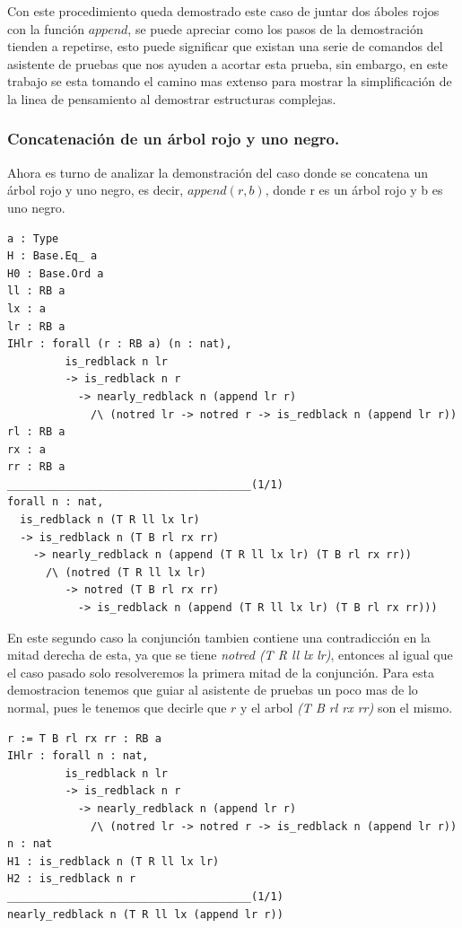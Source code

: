 \documentclass[8pt,leqno,pdflatex,spanish]{book}
\theoremstyle{plain}
\theoremstyle{definition}
\theoremstyle{remark}
\begin{document}
Con este procedimiento queda demostrado este caso de juntar dos \'aboles rojos con la funci\'on 
$append$, se puede apreciar como los pasos de la demostraci\'on tienden a repetirse, esto puede 
significar que existan una serie de comandos del asistente de pruebas que nos ayuden a acortar 
esta prueba, sin embargo, en este trabajo se esta tomando el camino mas extenso para mostrar la 
simplificaci\'on de la linea de pensamiento al demostrar estructuras complejas.

\subsubsection{Concatenaci\'on de un \'arbol rojo y uno negro.} 

Ahora es turno de analizar la demonstraci\'on del caso donde se concatena un \'arbol rojo y uno negro, es decir, $append(r,b)$, donde r es un \'arbol rojo y b es uno negro.

\begin{verbatim}
a : Type
H : Base.Eq_ a
H0 : Base.Ord a
ll : RB a
lx : a
lr : RB a
IHlr : forall (r : RB a) (n : nat),
         is_redblack n lr
         -> is_redblack n r
           -> nearly_redblack n (append lr r)
             /\ (notred lr -> notred r -> is_redblack n (append lr r))
rl : RB a
rx : a
rr : RB a
______________________________________(1/1)
forall n : nat,
  is_redblack n (T R ll lx lr)
  -> is_redblack n (T B rl rx rr)
    -> nearly_redblack n (append (T R ll lx lr) (T B rl rx rr))
      /\ (notred (T R ll lx lr)
         -> notred (T B rl rx rr)
           -> is_redblack n (append (T R ll lx lr) (T B rl rx rr)))
\end{verbatim}

En este segundo caso la conjunci\'on tambien contiene una contradicci\'on en la mitad derecha de 
esta, ya que se tiene \textit{notred (T R ll lx lr)}, entonces al igual que el caso pasado solo 
resolveremos la primera mitad de la conjunci\'on. Para esta demostracion tenemos que guiar al asistente de pruebas un poco mas de lo normal, pues le tenemos que decirle que $r$ y el arbol \textit{(T B rl rx rr)} son el mismo.

\begin{verbatim}
r := T B rl rx rr : RB a
IHlr : forall n : nat,
         is_redblack n lr
         -> is_redblack n r
           -> nearly_redblack n (append lr r)
             /\ (notred lr -> notred r -> is_redblack n (append lr r))
n : nat
H1 : is_redblack n (T R ll lx lr)
H2 : is_redblack n r
______________________________________(1/1)
nearly_redblack n (T R ll lx (append lr r))
\end{verbatim}
\end{document}
